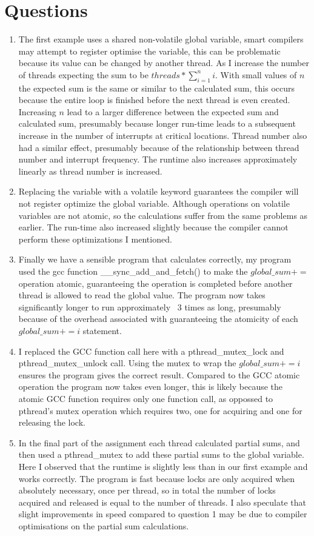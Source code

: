 \documentclass[12pt]{article}
\begin{document}
\section{Questions} 
\begin{enumerate}
\item The first example uses a shared non-volatile global variable, smart compilers may attempt to register optimise the variable, this can be problematic because its
    value can be changed by another thread. As I increase the number of threads expecting the sum to be $ threads * \sum_{i=1}^{n} i$. With small values of $ n $
    the expected sum is the same or similar to the calculated sum, this occurs because the entire loop is finished before the next thread is even created. Increasing $ n $ lead to a larger difference between the expected sum and calculated sum, presumably because longer run-time leads to a subsequent increase in the number of interrupts at critical locations. Thread number also had a similar effect, presumably because of the relationship between thread number and interrupt frequency. The runtime also increases approximately linearly as thread number is increased. 
    
\item Replacing the variable with a volatile keyword guarantees the compiler will not register optimize the global variable. Although operations on volatile variables are not atomic, so the calculations suffer from the same problems as earlier. The run-time also increased slightly because the compiler cannot perform these optimizations I mentioned. 
\item Finally we have a sensible program that calculates correctly, my program used the gcc function \_\_sync\_add\_and\_fetch() to make the $ global\_sum +=  $ operation atomic, guaranteeing the operation is completed before another thread is allowed to read the global value. The program now takes significantly longer to run approximately ~3 times as long, presumably because of the overhead associated with guaranteeing the atomicity of each $ global\_sum += i $ statement. 
\item  I replaced the GCC function call here with a pthread\_mutex\_lock and pthread\_mutex\_unlock call. Using the mutex to wrap the $ global\_sum += i $ ensures the program gives the correct result. Compared to the GCC atomic operation the program now takes even longer, this is likely because the atomic GCC function requires only one function call, as oppossed to pthread's mutex operation which requires two, one for acquiring and one for releasing the lock.  
\item In the final part of the assignment each thread calculated partial sums, and then used a pthread\_mutex to add these partial sums to the global variable. Here I observed that the runtime is slightly less than in our first example and works correctly. The program is fast because locks are only acquired when absolutely necessary, once per thread, so in total the number of locks acquired and released is equal to the number of threads. I also speculate that slight improvements in speed compared to question 1 may be due to compiler optimisations on the partial sum calculations.  
            
\end{enumerate} 
\end{document}

